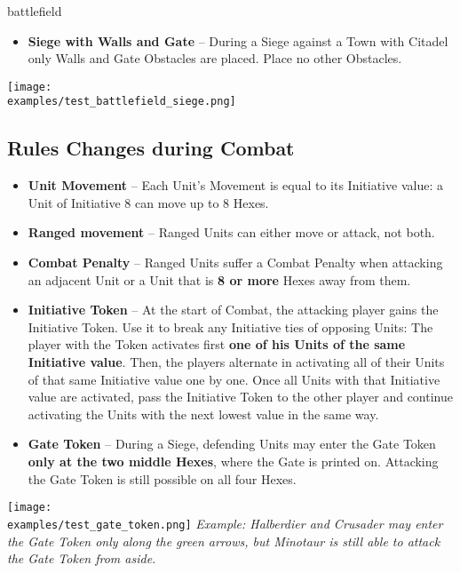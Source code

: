 \newpage
\begin{expansion}{battlefield}
  \begin{multicols*}{2}
  \begin{itemize}
    \item \textbf{Siege with Walls and Gate} – During a Siege against a Town with Citadel only Walls and Gate Obstacles are placed. Place no other Obstacles.
  \end{itemize}
  \texttt{[image: \\examples/test\_battlefield\_siege.png]}
  \subsection*{Rules Changes during Combat}
  \begin{itemize}
    \item \textbf{Unit Movement} – Each Unit's Movement is equal to its Initiative value: a Unit of Initiative 8 can move up to 8 Hexes.
    \item \textbf{Ranged movement}  – Ranged  Units can either move or attack, not both.
    \item \textbf{Combat Penalty} – Ranged  Units suffer a Combat Penalty when attacking an adjacent Unit or a Unit that is \textbf{8 or more} Hexes away from them.
    \columnbreak
    \item \textbf{Initiative Token} – At the start of Combat, the attacking player gains the Initiative Token.
    Use it to break any Initiative ties of opposing Units:
    The player with the Token activates first \textbf{one of his Units of the same Initiative value}.
    Then, the players alternate in activating all of their Units of that same Initiative value one by one.
    Once all Units with that Initiative value are activated, pass the Initiative Token to the other player and continue activating the Units with the next lowest value in the same way.
    \item \textbf{Gate Token} – During a Siege, defending Units may enter the Gate Token \textbf{only at the two middle Hexes}, where the Gate is printed on.
    Attacking the Gate Token is still possible on all four Hexes.
  \end{itemize}
  \texttt{[image: \\examples/test\_gate\_token.png]}
  \vspace*{1em}
  \footnotesize\textit{Example: Halberdier and Crusader may enter the Gate Token only along the green arrows, but Minotaur is still able to attack the Gate Token from aside.}
  \end{multicols*}
\end{expansion}

